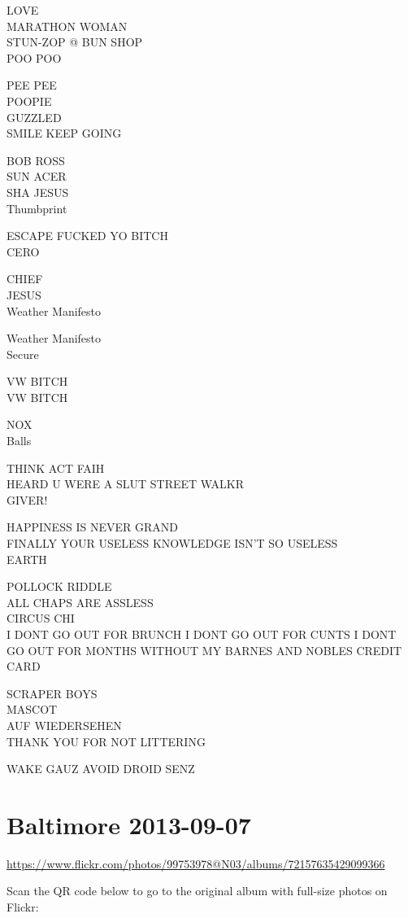 \documentclass[10pt,letterpaper]{article}
\begin{document}
LOVE\\
MARATHON WOMAN\\
STUN{-}ZOP @ BUN SHOP\\
POO POO

PEE PEE\\
POOPIE\\
GUZZLED\\
SMILE KEEP GOING

BOB ROSS\\
SUN ACER\\
SHA JESUS\\
Thumbprint

ESCAPE FUCKED YO BITCH\\
CERO

CHIEF\\
JESUS\\
Weather Manifesto

Weather Manifesto\\
Secure

VW BITCH\\
VW BITCH

NOX\\
Balls

THINK ACT FAIH\\
HEARD U WERE A SLUT STREET WALKR\\
GIVER!

HAPPINESS IS NEVER GRAND\\
FINALLY YOUR USELESS KNOWLEDGE ISN'T SO USELESS\\
EARTH

POLLOCK RIDDLE\\
ALL CHAPS ARE ASSLESS\\
CIRCUS CHI\\
I DONT GO OUT FOR BRUNCH I DONT GO OUT FOR CUNTS I DONT GO OUT FOR MONTHS WITHOUT MY BARNES AND NOBLES CREDIT CARD

SCRAPER BOYS\\
MASCOT\\
AUF WIEDERSEHEN\\
THANK YOU FOR NOT LITTERING

WAKE GAUZ AVOID DROID SENZ
\pagebreak

\section*{Baltimore 2013-09-07}

\url{https://www.flickr.com/photos/99753978@N03/albums/72157635429099366}

Scan the QR code below to go to the original album with full-size photos on Flickr:
\end{document}
